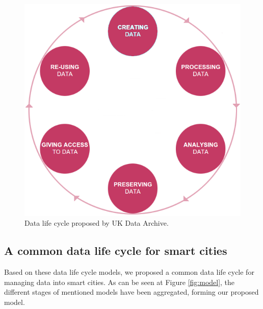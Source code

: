 \begin{figure}
    \center
    \includegraphics[scale=0.3]{img/data_lifecycle/uk-data-archive.png}
    \caption{Data life cycle proposed by UK Data Archive.}
    \label{fig:uk-data-archive}
\end{figure}

\subsection{A common data life cycle for smart cities}

Based on these data life cycle models, we proposed a common data life cycle for managing data into smart cities. As can be seen at Figure \ref{fig:model}, the different stages of mentioned models have been aggregated, forming our proposed model.

